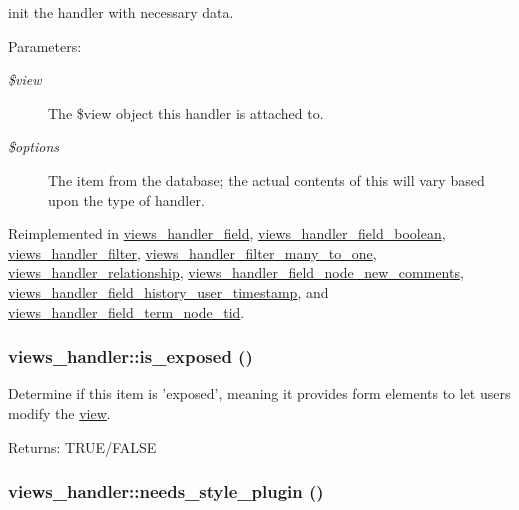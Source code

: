 init the handler with necessary data. \begin{Desc}
\item[Parameters:]
\begin{description}
\item[{\em \$view}]The \$view object this handler is attached to. \item[{\em \$options}]The item from the database; the actual contents of this will vary based upon the type of handler. \end{description}
\end{Desc}


Reimplemented in \hyperlink{classviews__handler__field_7eaaf0fd6fbc57c2955f88b257394d19}{views\_\-handler\_\-field}, \hyperlink{classviews__handler__field__boolean_0150fb8a25c2f1f2537d476b1c448238}{views\_\-handler\_\-field\_\-boolean}, \hyperlink{classviews__handler__filter_8bae65467710eb5f6cf6c2c46bd51c7b}{views\_\-handler\_\-filter}, \hyperlink{classviews__handler__filter__many__to__one_8417192dd11eaf273b05cbbc47990cbe}{views\_\-handler\_\-filter\_\-many\_\-to\_\-one}, \hyperlink{classviews__handler__relationship_a50c5d9c6b52fa2eeed61e88a74bc083}{views\_\-handler\_\-relationship}, \hyperlink{classviews__handler__field__node__new__comments_8f93300640b88efd9401dc2666fcc64a}{views\_\-handler\_\-field\_\-node\_\-new\_\-comments}, \hyperlink{classviews__handler__field__history__user__timestamp_0cc37c49613f0f55e4fc35733c35b806}{views\_\-handler\_\-field\_\-history\_\-user\_\-timestamp}, and \hyperlink{classviews__handler__field__term__node__tid_639e45d86c954e90120193b84c8b910b}{views\_\-handler\_\-field\_\-term\_\-node\_\-tid}.\hypertarget{classviews__handler_0c01527c54c1f1372f3c4f28ae34a837}{
\subsubsection[{is\_\-exposed}]{\setlength{\rightskip}{0pt plus 5cm}views\_\-handler::is\_\-exposed ()}}
\label{classviews__handler_0c01527c54c1f1372f3c4f28ae34a837}


Determine if this item is 'exposed', meaning it provides form elements to let users modify the \hyperlink{classview}{view}.

\begin{Desc}
\item[Returns:]TRUE/FALSE \end{Desc}
\hypertarget{classviews__handler_53baa97a6c218ce4b847c8fb4e65a350}{
\subsubsection[{needs\_\-style\_\-plugin}]{\setlength{\rightskip}{0pt plus 5cm}views\_\-handler::needs\_\-style\_\-plugin ()}}
\label{classviews__handler_53baa97a6c218ce4b847c8fb4e65a350}


